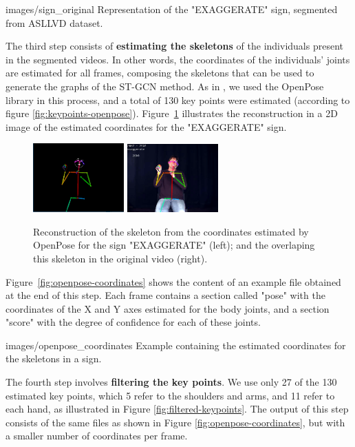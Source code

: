     {images/sign_original}
    {Representation of the "EXAGGERATE" sign, segmented from ASLLVD dataset.}

The third step consists of \textbf{estimating the skeletons} of the individuals present in the segmented videos. In other words, the coordinates of the individuals' joints are estimated for all frames, composing the skeletons that can be used to generate the graphs of the ST-GCN method. As in \cite {st-gcn-2018}, we used the OpenPose library in this process, and a total of 130 key points were estimated (according to figure \ref{fig:keypoints-openpose}). Figure~\ref{fig:sign-pose} illustrates the reconstruction in a 2D image of the estimated coordinates for the "EXAGGERATE" sign.

\begin{figure}[ht]
    \centering
    \includegraphics[width=3.5cm]{images/sign_pose}
    \includegraphics[width=3.5cm]{images/sign_pose_blended}
    \caption{Reconstruction of the skeleton from the coordinates estimated by OpenPose for the sign "EXAGGERATE" (left); and the overlaping this skeleton in the original video (right).}
    \label{fig:sign-pose}
\end{figure}

Figure~\ref{fig:openpose-coordinates} shows the content of an example file obtained at the end of this step. Each frame contains a section called "pose" with the coordinates of the X and Y axes estimated for the body joints, and a section "score" with the degree of confidence for each of these joints.

    {images/openpose_coordinates}
    {Example containing the estimated coordinates for the skeletons in a sign.}
    
The fourth step involves \textbf{filtering the key points}. We use only 27 of the 130 estimated key points, which 5 refer to the shoulders and arms, and 11 refer to each hand, as illustrated in Figure \ref{fig:filtered-keypoints}. The output of this step consists of the same files as shown in Figure \ref{fig:openpose-coordinates}, but with a smaller number of coordinates per frame.


